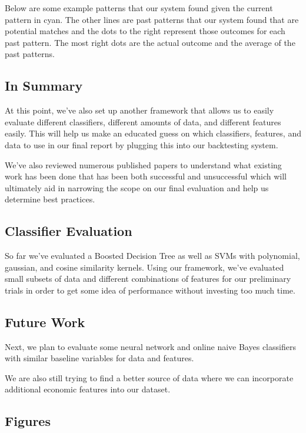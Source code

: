 \documentclass{article}
\begin{document}
Below are some example patterns that our system found given the current pattern in cyan.   The other lines are past patterns that our system found that are potential matches and the dots to the right represent those outcomes for each past pattern.  The most right dots are the actual outcome and the average of the past patterns.

\subsection{In Summary}

At this point, we've also set up another framework that allows us to easily evaluate different classifiers, different amounts of data, and different features easily. This will help us make an educated guess on which classifiers, features, and data to use in our final report by plugging this into our backtesting system.

We've also reviewed numerous published papers to understand what existing work has been done that has been both successful and unsuccessful which will ultimately aid in narrowing the scope on our final evaluation and help us determine best practices. 

\subsection{Classifier Evaluation}

So far we've evaluated a Boosted Decision Tree as well as SVMs with polynomial, gaussian, and cosine similarity kernels. Using our framework, we've evaluated small subsets of data and different combinations of features for our preliminary trials in order to get some idea of performance without investing too much time. 

\subsection{Future Work}

Next, we plan to evaluate some neural network and online naive Bayes classifiers with similar baseline variables for data and features.
 
We are also still trying to find a better source of data where we can incorporate additional economic features into our dataset.


\subsection{Figures}
\end{document}
